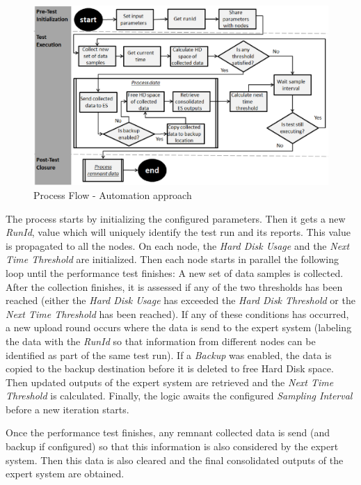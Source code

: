 \documentclass[runningheads,a4paper]{llncs}
\begin{document}
\begin{figure}[!h]
\centering
\includegraphics[width=1.0\textwidth]{ApproachDiagram}
\caption{Process Flow - Automation approach}
\label{fig_ApproachDiagram}
\end{figure}

The process starts by initializing the configured parameters. Then it gets
a new \emph{RunId}, value which will uniquely identify the test run and its reports.
This value is propagated to all the nodes. On each node, the \emph{Hard Disk
Usage} and  the \emph{Next Time Threshold} are initialized. Then each node
starts in parallel the following loop until the performance test finishes: A new
set of data samples is collected. After the collection finishes, it is assessed if any of
the two thresholds has been reached (either the \emph{Hard Disk Usage} has
exceeded the \emph{Hard Disk Threshold} or the \emph{Next Time Threshold} has
been reached). If any of these conditions has occurred, a new upload round
occurs where the data is send to the expert system (labeling the data with the
\emph{RunId} so that information from different nodes can be identified as part
of the same test run). If a \emph{Backup} was enabled, the data is copied to the
backup destination before it is deleted to free Hard Disk space. Then updated
outputs of the expert system are retrieved and the \emph{Next Time Threshold} is
calculated. Finally, the logic awaits the configured \emph{Sampling Interval}
before a new iteration starts.

Once the performance test finishes, any remnant collected data is send (and
backup if configured) so that this information is also considered by the expert
system. Then this data is also cleared and the final consolidated outputs of the
expert system are obtained.
\end{document}
